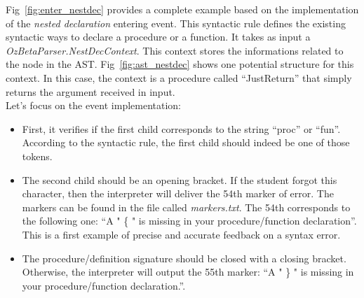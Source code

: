\documentclass[11pt,a4paper,twoside,openright]{report}
\begin{document}
Fig~\ref{fig:enter_nestdec} provides a complete example based on the 
implementation of the \textit{nested declaration} entering event. This syntactic 
rule defines the existing syntactic ways to declare a procedure or a function. 
It takes as input a \textit{OzBetaParser.NestDecContext}. This context stores 
the informations related to the node in the AST. Fig~\ref{fig:ast_nestdec} shows 
one potential structure for this context. In this case, the context is a 
procedure called \enquote{JustReturn} that simply returns the argument received 
in input.\\

Let's focus on the event implementation:
\begin{itemize}
 \item First, it verifies if the first child corresponds to the string 
\enquote{proc} or \enquote{fun}. According to the syntactic rule, the first 
child should indeed be one of those tokens.
 \item The second child should be an opening bracket. If the student 
forgot this character, then the interpreter will deliver the 54th marker of 
error. The markers can be found in the file called \textit{markers.txt}. The 
54th corresponds to the following one: \enquote{A " \{ " is missing in your 
procedure/function declaration}. This is a first example of precise and 
accurate feedback on a syntax error.
 \item The procedure/definition signature should be closed with a 
closing bracket. Otherwise, the interpreter will output the 55th marker: 
\enquote{A " \} " is missing in your procedure/function declaration.}.
\end{itemize}
\end{document}
